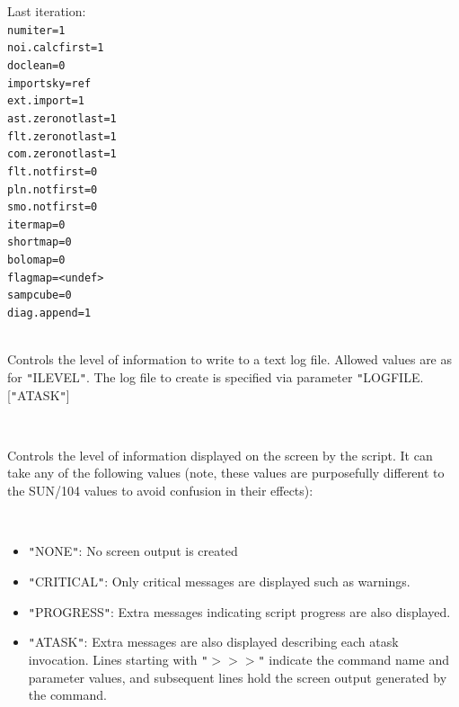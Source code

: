 \documentclass[twoside,11pt]{article}
\renewcommand{\_}{\texttt{\symbol{95}}}
\newcommand{\sstsubsection}[1]{ \item[{#1}] \mbox{} \\}
\newcommand{\sstitemlist}[1]{
  \mbox{} \\
  \vspace{-3.5ex}
  \begin{itemize}
     #1
  \end{itemize}
}
\newcommand{\sstitem}{\item}
\newcommand{\sstsubsection}[1]{\item[{#1}]}
\newcommand{\sstitemlist}[1]{
      \begin{itemize}
         #1
      \end{itemize}
      \\
   }
\newcommand{\sstitem}{\item}
\begin{document}
{{{{            \sstitem
            Last iteration:
            {\tt \\
               numiter=1 \\
               noi.calcfirst=1 \\
               doclean=0 \\
               importsky=ref \\
               ext.import=1 \\
               ast.zero\_notlast=1 \\
               flt.zero\_notlast=1 \\
               com.zero\_notlast=1 \\
               flt.notfirst=0 \\
               pln.notfirst=0 \\
               smo.notfirst=0 \\
               itermap=0 \\
               shortmap=0 \\
               bolomap=0 \\
               flagmap=<undef> \\
               sampcube=0 \\
               diag.append=1
            }
         }
      }
      \sstsubsection{
         GLEVEL = LITERAL (Read)
      }{
         Controls the level of information to write to a text log file.
         Allowed values are as for {\tt "}ILEVEL{\tt "}. The log file to create is
         specified via parameter {\tt "}LOGFILE. [{\tt "}ATASK{\tt "}]
      }
      \sstsubsection{
         ILEVEL = LITERAL (Read)
      }{
         Controls the level of information displayed on the screen by the
         script. It can take any of the following values (note, these values
         are purposefully different to the SUN/104 values to avoid confusion
         in their effects):

         \sstitemlist{

            \sstitem
            {\tt "}NONE{\tt "}: No screen output is created

            \sstitem
            {\tt "}CRITICAL{\tt "}: Only critical messages are displayed such as warnings.

            \sstitem
            {\tt "}PROGRESS{\tt "}: Extra messages indicating script progress are also
            displayed.

            \sstitem
            {\tt "}ATASK{\tt "}: Extra messages are also displayed describing each atask
            invocation. Lines starting with {\tt "}$>$$>$$>${\tt "} indicate the command name
            and parameter values, and subsequent lines hold the screen output
            generated by the command.

}}}}
\end{document}
